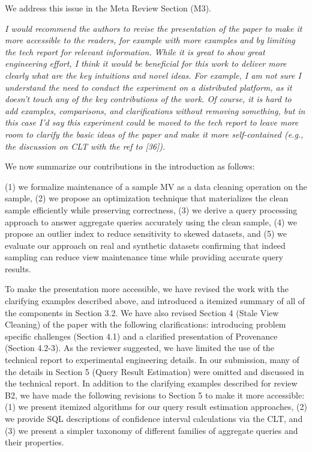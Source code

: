 We address this issue in the Meta Review Section (M3).

\vspace{1em}
\emph{I would recommend the authors to revise the presentation of the paper to make it more accessible to the readers, for example with more examples and by limiting the tech report for relevant information. While it is great to show great engineering effort, I think it would be beneficial for this work to deliver more clearly what are the key intuitions and novel ideas. For example, I am not sure I understand the need to conduct the experiment on a distributed platform, as it doesn't touch any of the key contributions of the work. Of course, it is hard to add examples, comparisons, and clarifications without removing something, but in this case I'd say this experiment could be moved to the tech report to leave more room to clarify the basic ideas of the paper and make it more self-contained (e.g., the discussion on CLT with the ref to [36]).}

We now summarize our contributions in the introduction as follows:
\begin{displayquote}
(1) we formalize maintenance of a sample MV as a data cleaning operation on the sample, (2) we propose an optimization technique that materializes the clean sample efficiently while preserving correctness, (3) we derive a query processing approach to answer aggregate queries accurately using the clean sample, (4) we propose an outlier index to reduce sensitivity to skewed datasets, and (5) we evaluate our approach on real and synthetic datasets confirming that indeed sampling can reduce view maintenance time while providing accurate query results. 
\end{displayquote}
To make the presentation more accessible, we have revised the work with the clarifying examples described above, and introduced a itemized summary of all of the components in Section 3.2. We have also revised Section 4 (Stale View Cleaning) of the paper with the following clarifications: introducing problem specific challenges (Section 4.1) and a clarified presentation of Provenance (Section 4.2-3). As the reviewer suggested, we have limited the use of the technical report to experimental engineering details. In our submission, many of the details in Section 5 (Query Result Estimation) were omitted and discussed in the technical report. In addition to the clarifying examples described for review B2, we have made the following revisions to Section 5 to make it more accessible: (1) we present itemized algorithms for our query result estimation approaches, (2) we provide SQL descriptions of confidence interval calculations via the CLT, and (3) we present a simpler taxonomy of different families of aggregate queries and their properties.

